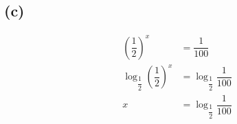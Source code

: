\documentclass{article}
\begin{document}
\subsection*{(c)}
\begin{equation}
\begin{split}
	(\dfrac{1}{2})^x & = \dfrac{1}{100} \\
	\log_{\dfrac{1}{2}}(\dfrac{1}{2})^x & = \log_{\dfrac{1}{2}}\dfrac{1}{100} \\
	 x & = \log_{\dfrac{1}{2}}\dfrac{1}{100} \\
\end{split}
\end{equation}
\end{document}
